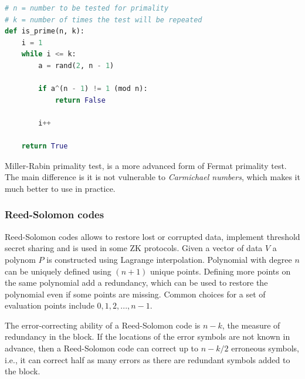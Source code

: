 \documentclass[../lecture-notes.tex]{subfiles}
\begin{document}
\begin{lstlisting}[language=Python]
# n = number to be tested for primality
# k = number of times the test will be repeated
def is_prime(n, k):
    i = 1
    while i <= k:
        a = rand(2, n - 1)

        if a^(n - 1) != 1 (mod n):
            return False

        i++

    return True
\end{lstlisting}

Miller-Rabin primality test, is a more advanced form of Fermat primality test. The main difference is it is not vulnerable to \textit{Carmichael numbers},
which makes it much better to use in practice.

\subsubsection{Reed-Solomon codes}

Reed-Solomon codes allows to restore lost or corrupted data, implement threshold secret sharing and is used in some ZK protocols.
Given a vector of data $V$ a polynom $P$ is constructed using Lagrange interpolation.
Polynomial with degree $n$ can be uniquely defined using $(n+1)$ unique points. Defining more points on the same polynomial add a redundancy,
which can be used to restore the polynomial even if some points are missing.
Common choices for a set of evaluation points include ${0, 1, 2, ..., n - 1}$.

The error-correcting ability of a Reed-Solomon code is $n-k$, the measure of redundancy in the block. 
If the locations of the error symbols are not known in advance, then a Reed-Solomon code can correct up to
$n-k/2$ erroneous symbols, i.e., it can correct half as many errors as there are redundant symbols added to the block.
\end{document}
